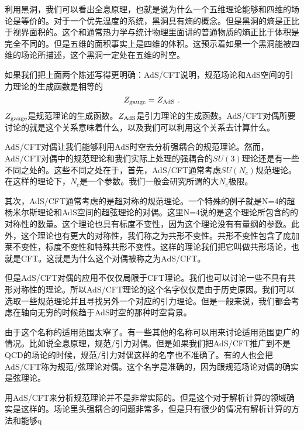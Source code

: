 利用黑洞，我们可以看出全息原理，也就是说为什么一个五维理论能够和四维的场论是等价的。对于一个优先温度的系统，黑洞具有熵的概念。但是黑洞的熵是正比于视界面积的。这个和通常热力学与统计物理里面讲的普通物质的熵正比于体积是完全不同的。但是五维的面积事实上是四维的体积。这预示着如果一个黑洞能被四维的场论所描述，这个黑洞一定处在五维的时空。

如果我们把上面两个陈述写得更明确：AdS/CFT说明，规范场论和AdS空间的引力理论的生成函数是相等的
\begin{equation}
Z_{\rm gauge}=Z_{\rm AdS}~.
\end{equation}
$Z_{\rm gauge}$是规范理论的生成函数。$Z_{\rm AdS}$是引力理论的生成函数。AdS/CFT对偶所要讨论的就是这个关系意味着什么，以及我们可以利用这个关系去计算什么。

AdS/CFT对偶让我们能够利用AdS时空去分析强耦合的规范理论。然而，AdS/CFT对偶中的规范理论和我们实际上处理的强耦合的$SU(3)$理论还是有一些不同之处的。这些不同之处在于，首先，AdS/CFT通常考虑$SU(N_c)$规范理论。在这样的理论下，$N_c$是一个参数。我们一般会研究所谓的大$N_c$极限。

其次，AdS/CFT通常考虑的是超对称的规范理论。一个特殊的例子就是N=4的超杨米尔斯理论和AdS空间的超弦理论的对偶。这里N=4说的是这个理论所包含的的对称性的数量。这个理论也具有标度不变性，因为这个理论没有有量纲的参数。此外，这个理论也有更大的对称性，我们称之为共形不变性。共形不变性包含了庞加莱不变性，标度不变性和特殊共形不变性。这样的理论我们把它叫做共形场论，也就是CFT。这就是为什么这个对偶被称之为AdS/CFT。

但是AdS/CFT对偶的应用不仅仅局限于CFT理论。我们也可以讨论一些不具有共形对称性的理论。所以AdS/CFT理论的这个名字仅仅是由于历史原因。我们可以选取一些规范理论并且寻找另外一个对应的引力理论。但是一般来说，我们都会考虑在轴向无穷的时候趋于AdS时空的那种时空背景。

由于这个名称的适用范围太窄了。有一些其他的名称可以用来讨论适用范围更广的情况。比如说全息原理，规范/引力对偶。但是如果我们把AdS/CFT推广到不是QCD的场论的时候，规范/引力对偶这样的名字也不准确了。有的人也会把AdS/CFT称为规范/弦理论对偶。这个名字是准确的，因为跟规范场论对偶的确实是弦理论。

用AdS/CFT来分析规范理论并不是非常实际的。但是这个对于解析计算的领域确实是这样的。场论里头强耦合的问题非常多，但是只有很少的情况有解析计算的方法和能够q

